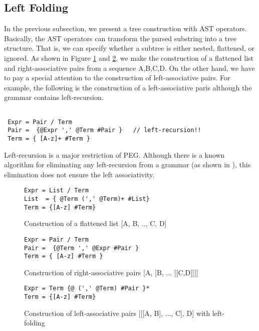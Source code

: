 \documentclass[JIP]{ipsj}
\begin{document}
\subsection{Left Folding}

In the previous subsection, we present a tree construction with AST operators. Basically, the AST operators can transform the parsed substring into a tree structure. That is, we can specify whether a subtree is either nested, flattened, or ignored. As shown in Figure \ref{fig:list} and \ref{fig:right}, we make the construction of a flattened list and right-associative pairs from a sequence A,B,C,D. On the other hand, we have to pay a special attention to the construction of left-associative pairs. For example, the following is the construction of a left-associative paris although the grammar contains left-recursion.

{\small \begin{verbatim}

 Expr = Pair / Term
 Pair =  {@Expr ',' @Term #Pair }   // left-recursion!!
 Term = { [A-z]+ #Term }

\end{verbatim}}

Left-recursion is a major restriction of PEG. Although there is a known algorithm for eliminating any left-recursion from a grammar (as shown in \cite{OOPSLA14_Antlr}), this elimination does not ensure the left associativity. 

\begin{figure}[tb]
{\small \begin{framed} \begin{verbatim}
Expr = List / Term
List  = { @Term (',' @Term)+ #List}
Term = {[A-z] #Term}
\end{verbatim} \end{framed}}
\caption{Construction of a flattened list [A, B, .., C, D]}
\label{fig:list}
\end{figure}

\begin{figure}[tb]
{\small \begin{framed} \begin{verbatim}
Expr = Pair / Term
Pair =  {@Term ',' @Expr #Pair } 
Term = { [A-z] #Term }
\end{verbatim} \end{framed} }
\caption{Construction of right-associative pairs [A, [B, ... [[C,D]]]]}
\label{fig:right}
\end{figure}

\begin{figure}[tb]
{\small \begin{framed} \begin{verbatim}
Expr = Term {@ (',' @Term) #Pair }*
Term = {[A-z] #Term}
\end{verbatim} \end{framed} }
\caption{Construction of left-associative pairs [[[A, B], ..., C], D] with left-folding}
\label{fig:left}
\end{figure}
\end{document}
